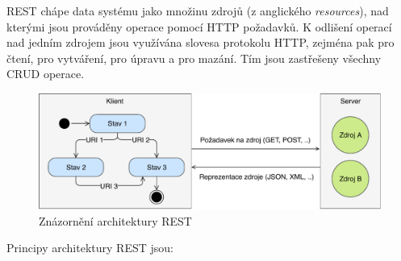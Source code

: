 \gls{REST} chápe data systému jako množinu zdrojů (z anglického \textit{resources}),
nad kterými jsou prováděny operace pomocí \gls{HTTP} požadavků. K odlišení operací
nad jedním zdrojem jsou využívána slovesa protokolu \gls{HTTP}, zejména pak  pro čtení,
 pro vytváření,  pro úpravu a  pro mazání. Tím jsou zastřešeny
všechny \gls{CRUD} operace.

\begin{figure}[t]
    \centering
    \includegraphics[keepaspectratio=true, width=0.9\linewidth]{figures/rest-statelessness.pdf}
    \caption{Znázornění architektury \gls{REST}}
    \label{fig:rest-statelessness}
\end{figure}

Principy architektury \gls{REST} jsou:

